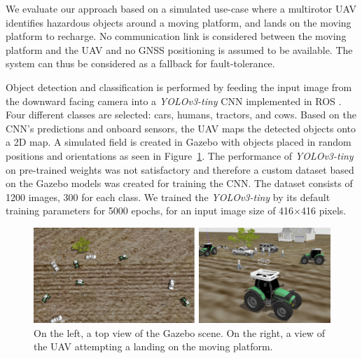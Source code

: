 \documentclass[conference]{IEEEtran}
\begin{document}
We evaluate our approach based on a simulated use-case where a multirotor UAV identifies
hazardous objects around a moving platform, and lands on the
moving platform to recharge.
No communication link is considered between the moving platform and the UAV
and no GNSS positioning is assumed to be available. The system can thus be
considered as a fallback for fault-tolerance.

Object detection and classification is performed by feeding the input
image from the downward facing camera into a \emph{YOLOv3-tiny} CNN
\cite{yolov3} implemented in ROS \cite{bjelonicYolo2018}. Four
different classes are selected: cars, humans, tractors, and
cows. Based on the CNN's predictions and onboard
sensors, the UAV maps the detected objects onto a 2D map. A simulated field is created in Gazebo with objects placed in random
positions and orientations as seen in Figure~\ref{fig:Gazebo}. The performance of \emph{YOLOv3-tiny} on pre-trained weights was not satisfactory and therefore a custom dataset based on the Gazebo models was created for training the CNN. The dataset consists of 1200 images, 300
for each class. We trained the \emph{YOLOv3-tiny} by its default training
parameters for 5000 epochs, for an input image size of \SI{416}{}$\times$\SI{416}{}
pixels.

\begin{figure}[t]
\centering
\includegraphics[scale=0.2]{gazebo_scalled_gamma_corrected.png}
\caption{On the left, a top view of the Gazebo scene. 
On the right, a view of the UAV attempting a landing on the moving platform.}
\label{fig:Gazebo}
\end{figure}





\end{document}
